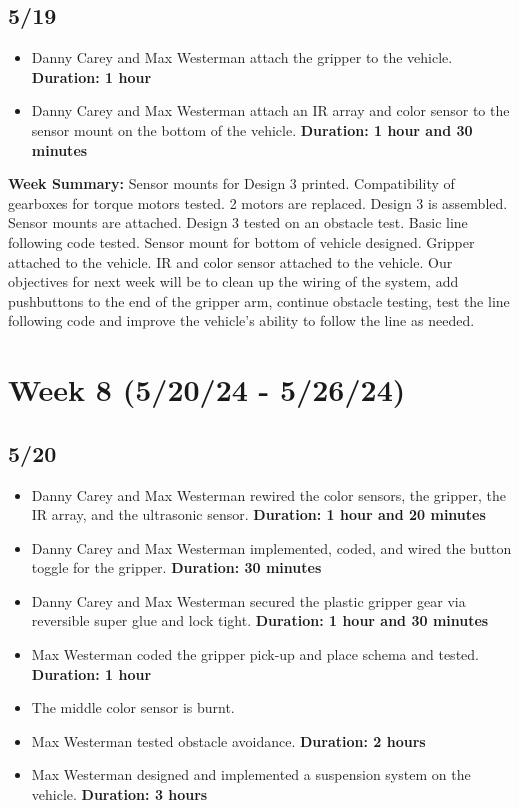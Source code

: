 \documentclass[11pt]{report}
\begin{document}
\subsection*{5/19}

\begin{itemize}
    \item Danny Carey and Max Westerman attach the gripper to the vehicle. \textbf{Duration: 1 hour}
    \item Danny Carey and Max Westerman attach an \gls{IR} array and color sensor to the sensor mount on the bottom of the vehicle. \textbf{Duration: 1 hour and 30 minutes}
\end{itemize}

\textbf{Week Summary:} Sensor mounts for Design 3 printed. Compatibility of gearboxes for torque motors tested. 2 motors are replaced. Design 3 is assembled. Sensor mounts are attached. Design 3 tested on an obstacle test. Basic line following code tested. Sensor mount for bottom of vehicle designed. Gripper attached to the vehicle. \gls{IR} and color sensor attached to the vehicle. Our objectives for next week will be to clean up the wiring of the system, add pushbuttons to the end of the gripper arm, continue obstacle testing, test the line following code and improve the vehicle’s ability to follow the line as needed.

\section{Week 8 (5/20/24 - 5/26/24)}
\subsection*{5/20}

\begin{itemize}
    \item Danny Carey and Max Westerman rewired the color sensors, the gripper, the \gls{IR} array, and the ultrasonic sensor. \textbf{Duration: 1 hour and 20 minutes}
    \item Danny Carey and Max Westerman implemented, coded, and wired the button toggle for the gripper. \textbf{Duration: 30 minutes}
    \item Danny Carey and Max Westerman secured the plastic gripper gear via reversible super glue and lock tight. \textbf{Duration: 1 hour and 30 minutes}
    \item Max Westerman coded the gripper pick-up and place schema and tested. \textbf{Duration: 1 hour}
    \item The middle color sensor is burnt.
    \item Max Westerman tested obstacle avoidance. \textbf{Duration: 2 hours}
    \item Max Westerman designed and implemented a suspension system on the vehicle. \textbf{Duration: 3 hours}
\end{itemize}
\end{document}
